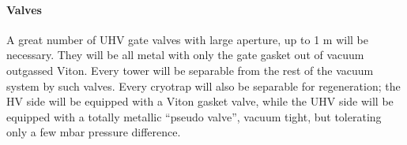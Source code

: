 \paragraph{Valves}

A great number of UHV gate valves with large aperture, up to 1 m  will be necessary. They will be all metal with only the gate gasket out of vacuum outgassed Viton. Every tower will be separable from the rest of the vacuum system by such valves. Every cryotrap will also be separable for regeneration; the HV side will be equipped with a Viton gasket valve, while the UHV side will be equipped with a totally metallic ``pseudo valve'', vacuum tight, but tolerating only a few mbar pressure difference.




%
%
%


